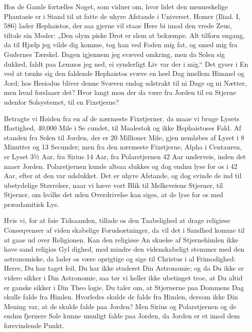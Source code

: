 \documentclass[12pt]{book}
\newcommand{\opage}[1]{\marginnote{\footnotesize\textit{[#1]}}}
\begin{document}
Hos de Gamle fortælles Noget, som vidner om,
hvor lidet den menneskelige Phantasie er i Stand til
at fatte de uhyre Afstande i Universet. Homer (Iliad. I,
586) lader Hephaistos, der saa gjerne vil staae Here
bi imod den vrede Zeus, tiltale sin Moder: „Den olym\-%
piske Drot er slem at bekæmpe. Alt tilforn engang,
da til Hjælp jeg vilde dig komme, tog han ved Foden
mig fat, og smed mig fra Gudernes Tærskel. Dagen
igjennem jeg svæved omkring, men da Solen sig dukked,
faldt paa Lemnos jeg ned, ei synderligt Liv var der i
mig.“ Det gyser i En ved at tænke sig den faldende
Hephaistos svæve en heel Dag imellem Himmel og Jord;
hos Hesiodus bliver denne Svæven endog udstrakt
til ni Dage og ni Nætter, men hvad forslaaer det? Hvor
langt mon der da være fra Jorden til en Stjerne udenfor
Solsystemet, til en Fixstjerne?

Betragte vi Høiden fra en af de nærmeste Fixstjerner,
da maae vi bruge Lysets Hastighed, 40,000 Mile i Se\-%
cundet, til Maalestok og ikke Hephaistoses Fald. Af\-%
standen fra Solen til Jorden, der er 20 Millioner Mile, gjen\-%
nemløbes af Lyset i 8 Minutter og 13 Secunder; men fra
den nærmeste Fixstjerne, Alpha i Centauren, er Lyset
3½ Aar, fra Sirius 14 Aar, fra Polarstjernen 42 Aar
underveis, inden det naaer Jorden. Polarstjernen kunde
altsaa slukkes og dog endnu lyse for os i 42 Aar, efter
at den var udslukket. Det er uhyre Afstande, og dog
svinde de ind til ubetydelige Størrelser, naar vi hæve
vort Blik til Melkeveiens Stjerner, til Stjerner, om hvilke
det uden Overdrivelse kan siges, at de lyse for os med
præadamitisk Lys.
\opage{68}\setcounter{footnote}{0}%

Hvis vi, for at føie Tidsaanden, tillade os den
Taabelighed at drage religiøse Conseqvenser af viden\-%
skabelige Forudsætninger, da vil det i Sandhed komme
til at gaae ud over Religionen. Kan den religiøse An\-%
skuelse af Stjernehimlen ikke have sand religiøs Gyl\-%
dighed, med mindre den videnskabeligt stemmer med
den astronomiske, da lader os være oprigtige og sige til
Christus i al Frimodighed: Herre, Du har taget feil, Du
har ikke studeret Din Astronomie; og da Du ikke er
videre sikker i Din Astronomie, saa tør vi heller ikke
ubetinget troe, at Du altid er ganske sikker i Din Theo\-%
logie. Du taler om, at Stjernerne paa Dommens Dag
skulle falde fra Himlen. Hvorledes skulde de falde fra
Himlen, dersom ikke Din Mening var, at de skulde falde
paa Jorden? Men Sirius og Polarstjernen og de endnu
fjernere Sole kunne umuligt falde paa Jorden, da Jorden
er et imod dem forsvindende Punkt.
\end{document}
